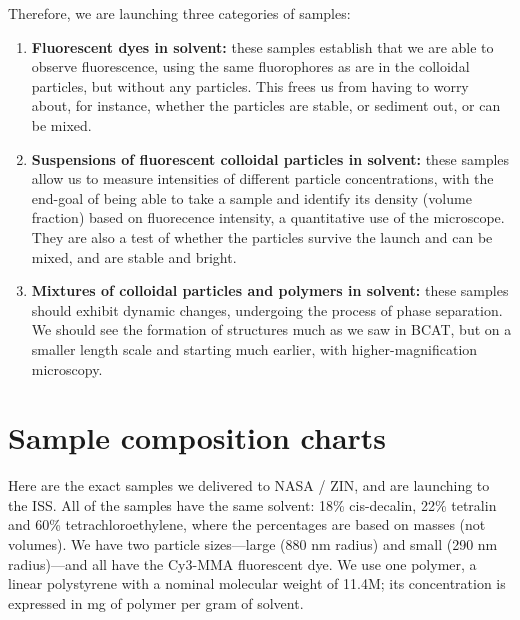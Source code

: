 Therefore, we are launching three categories of samples:
\begin{enumerate}
\item \textbf{Fluorescent dyes in solvent:} these samples establish that we are able to observe fluorescence, using the same fluorophores as are in the colloidal particles, but without any particles. This frees us from having to worry about, for instance, whether the particles are stable, or sediment out, or can be mixed.

\item \textbf{Suspensions of fluorescent colloidal particles in solvent:} these samples allow us to measure intensities of different particle concentrations, with the end-goal of being able to take a sample and identify its density (volume fraction) based on fluorecence intensity, a quantitative use of the microscope. They are also a test of whether the particles survive the launch and can be mixed, and are stable and bright.

\item \textbf{Mixtures of colloidal particles and polymers in solvent:} these samples should exhibit dynamic changes, undergoing the process of phase separation. We should see the formation of structures much as we saw in BCAT, but on a smaller length scale and starting much earlier, with higher-magnification microscopy.

\end{enumerate}

\section{Sample composition charts}\label{sample-composition-charts}
Here are the exact samples we delivered to NASA / ZIN, and are launching to the ISS. All of the samples have the same solvent: 18\% cis-decalin, 22\% tetralin and 60\% tetrachloroethylene, where the percentages are based on masses (not volumes). We have two particle sizes---large (880 nm radius) and small (290 nm radius)---and all have the Cy3-MMA fluorescent dye. We use one polymer, a linear polystyrene with a nominal molecular weight of 11.4M; its concentration is expressed in mg of polymer per gram of solvent.

